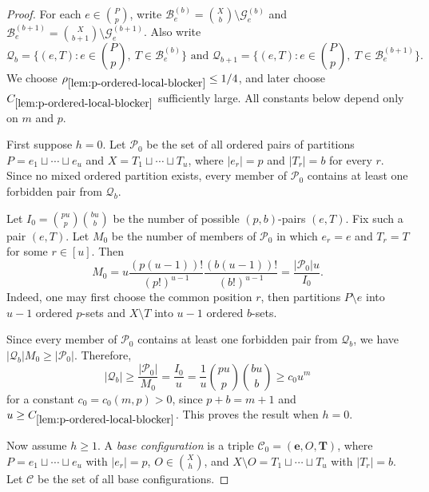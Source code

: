 \documentclass[10pt,a4paper]{article}
\numberwithin{equation}{section}
\theoremstyle{definition}
\newcommand{\G}{\mathcal G}
\begin{document}
\begin{proof}
        For each $e\in\binom Pp$, write $\mathcal B_e^{(b)}=\binom Xb\setminus\G_e^{(b)}$ and $\mathcal B_e^{(b+1)}=\binom X{b+1}\setminus\G_e^{(b+1)}$.
        Also write
        \[
                \mathcal Q_b=\{(e,T):e\in\binom Pp,\ T\in\mathcal B_e^{(b)}\} \text{ and }\mathcal Q_{b+1}=\{(e,T):e\in\binom Pp,\ T\in\mathcal B_e^{(b+1)}\}.
        \]
        We choose $\rho_{\ref{lem:p-ordered-local-blocker}}\le1/4$, and later choose $C_{\ref{lem:p-ordered-local-blocker}}$ sufficiently large.
        All constants below depend only on $m$ and $p$.

        First suppose $h=0$.
        Let $\mathcal P_0$ be the set of all ordered pairs of partitions $P=e_1\sqcup\cdots\sqcup e_u$ and $X=T_1\sqcup\cdots\sqcup T_u$, where $|e_r|=p$ and $|T_r|=b$ for every $r$.
        Since no mixed ordered partition exists, every member of $\mathcal P_0$ contains at least one forbidden pair from $\mathcal Q_b$.

        Let $I_0=\binom{pu}{p}\binom{bu}{b}$ be the number of possible $(p,b)$-pairs $(e,T)$.
        Fix such a pair $(e,T)$.
        Let $M_0$ be the number of members of $\mathcal P_0$ in which $e_r=e$ and $T_r=T$ for some $r\in[u]$.
        Then
        \[
                M_0
                =
                u\frac{(p(u-1))!}{(p!)^{u-1}}\frac{(b(u-1))!}{(b!)^{u-1}}
                =
                \frac{|\mathcal P_0|u}{I_0}.
        \]
        Indeed, one may first choose the common position $r$, then partitions $P\setminus e$ into $u-1$ ordered $p$-sets and $X\setminus T$ into $u-1$ ordered $b$-sets.

        Since every member of $\mathcal P_0$ contains at least one forbidden pair from $\mathcal Q_b$, we have $|\mathcal Q_b|M_0\ge |\mathcal P_0|$.
        Therefore,
        \[
                |\mathcal Q_b|
                \ge
                \frac{|\mathcal P_0|}{M_0}
                =
                \frac{I_0}{u}
                =
                \frac1u\binom{pu}{p}\binom{bu}{b}
                \ge c_0u^m
        \]
        for a constant $c_0=c_0(m,p)>0$, since $p+b=m+1$ and $u\ge C_{\ref{lem:p-ordered-local-blocker}}$.
        This proves the result when $h=0$.

        Now assume $h\ge1$.
        A \emph{base configuration} is a triple $\mathcal C_0=(\mathbf e,O,\mathbf T)$, where $P=e_1\sqcup\cdots\sqcup e_u$ with $|e_r|=p$, $O\in\binom Xh$, and $X\setminus O=T_1\sqcup\cdots\sqcup T_u$ with $|T_r|=b$.
        Let $\mathcal C$ be the set of all base configurations.


\end{proof}
\end{document}
